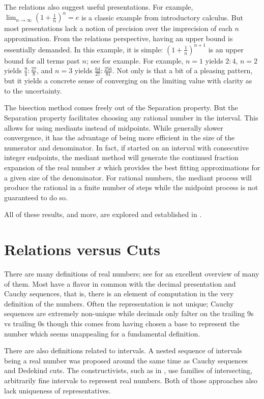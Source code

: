 \documentclass[12pt]{article}
\begin{document}
The relations also suggest useful presentations. For example, $\lim_{n \to \infty} (1+\frac{1}{n})^n = e$ is a classic example from introductory calculus. But most presentations lack a notion of precision over the imprecision of each $n$ approximation. From the relations perspective, having an upper bound is essentially demanded. In this example, it is simple: $(1 + \frac{1}{n})^{n+1}$ is an upper bound for all terms past $n$; see \cite{mend} for example. For example, $n=1$ yields $2:4$, $n=2$ yields $\frac{9}{4}:\frac{27}{8}$, and $n=3$ yields $\frac{64}{27}:\frac{256}{81}$. Not only is that a bit of a pleasing pattern, but it yields a concrete sense of converging on the limiting  value with clarity as to the uncertainty. 

The bisection method comes freely out of the Separation property. But the Separation property facilitates choosing any rational number in the interval. This allows for using mediants instead of midpoints. While generally slower convergence, it has the advantage of being more efficient in the size of the numerator and denominator. In fact, if started on an interval with consecutive integer endpoints, the mediant method will generate the continued fraction expansion of the real number $x$ which provides the best fitting approximations for a given size of the denominator. For rational numbers, the mediant process will produce the rational in a finite number of steps while the midpoint process is not guaranteed to do so. 

All of these results, and more, are explored and established in \cite{taylor23main}.

\section{Relations versus Cuts}

There are many definitions of real numbers; see \cite{ittay-2015} for an excellent overview of many of them. Most have a flavor in common with the decimal presentation and Cauchy sequences, that is, there is an element of computation in the very definition of the numbers. Often the representation is not unique; Cauchy sequences are extremely non-unique while decimals only falter on the trailing 9s vs trailing 0s though this comes from having chosen a base to represent the number which seems unappealing for a fundamental definition.   

There are also definitions related to intervals. A nested sequence of intervals being a real number was proposed around the same time as Cauchy sequences and Dedekind cuts. The constructivists, such as in \cite{bridger}, use families of intersecting, arbitrarily fine intervals to represent real numbers. Both of those approaches also lack uniqueness of representatives. 
\end{document}
